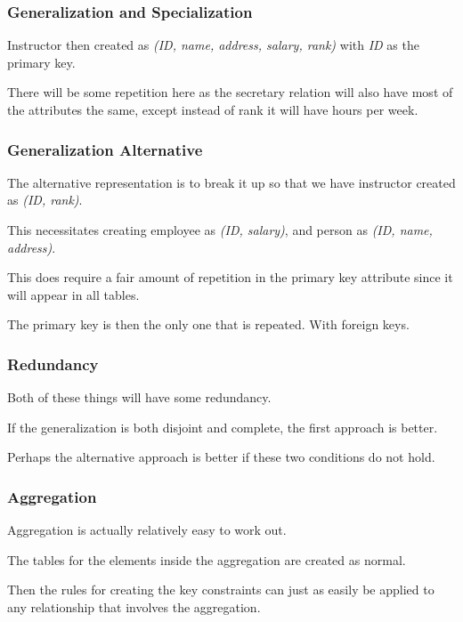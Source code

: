 \begin{frame}
\frametitle{Generalization and Specialization}

Instructor then created as \textit{(ID, name, address, salary, rank)} with \textit{ID} as the primary key. 

There will be some repetition here as the secretary relation will also have most of the attributes the same, except instead of rank it will have hours per week.

\end{frame}



\begin{frame}
\frametitle{Generalization Alternative}

The alternative representation is to break it up so that we have instructor created as \textit{(ID, rank)}.

This necessitates creating employee as \textit{(ID, salary)}, and person as \textit{(ID, name, address)}. 

This does require a fair amount of repetition in the primary key attribute since it will appear in all tables. 

The primary key is then the only one that is repeated. With foreign keys.


\end{frame}



\begin{frame}
\frametitle{Redundancy}

Both of these things will have some redundancy. 

If the generalization is both disjoint and complete, the first approach is better.

Perhaps the alternative approach is better if these two conditions do not hold.

\end{frame}



\begin{frame}
\frametitle{Aggregation}

Aggregation is actually relatively easy to work out. 

The tables for the elements inside the aggregation are created as normal. 

Then the rules for creating the key constraints can just as easily be applied to any relationship that involves the aggregation. 

\end{frame}



